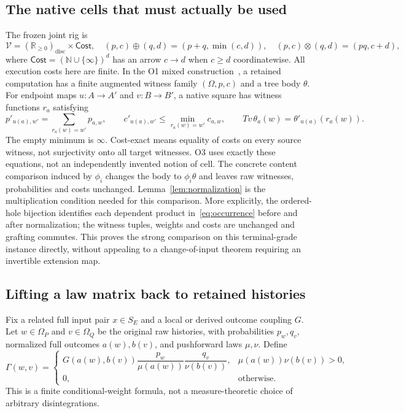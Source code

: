 \documentclass[11pt,a4paper]{article}
\theoremstyle{definition}
\newcommand{\Cost}{\mathsf{Cost}}
\begin{document}
\subsection{The native cells that must actually be used}
The frozen joint rig is
\[
 \mathcal V=(\mathbb R_{\ge0})_{\mathrm{disc}}\times\Cost,
 \quad(p,c)\oplus(q,d)=(p+q,\min(c,d)),
 \quad(p,c)\otimes(q,d)=(pq,c+d),
\]
where $\Cost=(\mathbb N\cup\{\infty\})^d$ has an arrow $c\to d$
when $c\ge d$ coordinatewise. All execution costs here are finite. In
the O1 mixed construction~\cite{O1}, a retained computation has a finite
augmented witness family $(\Omega,p,c)$ and a tree body $\theta$.
For endpoint maps $u:A\to A'$ and $v:B\to B'$, a native square has
witness functions $r_a$ satisfying
\begin{equation}\label{eq:native}
 p'_{u(a),w'}=\sum_{r_a(w)=w'}p_{a,w},\qquad
 c'_{u(a),w'}\le\min_{r_a(w)=w'}c_{a,w},\qquad
 Tv\,\theta_a(w)=\theta'_{u(a)}(r_a(w)).
\end{equation}
The empty minimum is $\infty$. Cost-exact means equality of costs on
every source witness, not surjectivity onto all target witnesses.
O3 uses exactly these equations, not an independently invented notion of
cell. The concrete content comparison induced by $\phi_i$ changes the
body to $\phi_i\theta$ and leaves raw witnesses, probabilities and costs
unchanged. Lemma~\ref{lem:normalization} is the multiplication condition
needed for this comparison. More explicitly, the ordered-hole
bijection identifies each dependent product in~\eqref{eq:occurrence}
before and after normalization; the witness tuples, weights and costs
are unchanged and grafting commutes. This proves the strong comparison
on this terminal-grade instance directly, without appealing to a
change-of-input theorem requiring an invertible extension map.

\subsection{Lifting a law matrix back to retained histories}
Fix a related full input pair $x\in S_E$ and a local or derived outcome
coupling $G$. Let $w\in\Omega_P$ and $v\in\Omega_Q$ be the original
raw histories, with probabilities $p_w,q_v$, normalized full outcomes
$a(w),b(v)$, and pushforward laws $\mu,\nu$. Define
\begin{equation}\label{eq:raw-lift}
 \Gamma(w,v)=
 \begin{cases}
 G(a(w),b(v))\dfrac{p_w}{\mu(a(w))}\dfrac{q_v}{\nu(b(v))},
       &\mu(a(w))\nu(b(v))>0,\\[6pt]
 0,&\text{otherwise}.
 \end{cases}
\end{equation}
This is a finite conditional-weight formula, not a measure-theoretic
choice of arbitrary disintegrations.
\end{document}
